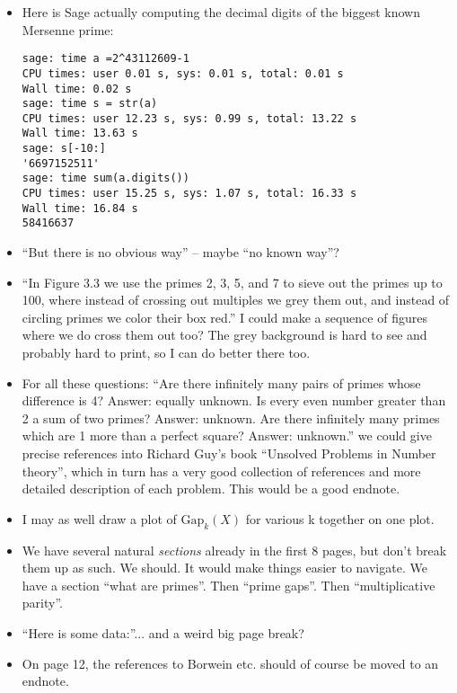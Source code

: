 \documentclass{article}
\begin{document}
\begin{itemize}
\item Here is Sage actually computing the decimal digits of the
  biggest known Mersenne prime:
\begin{verbatim}
sage: time a =2^43112609-1
CPU times: user 0.01 s, sys: 0.01 s, total: 0.01 s
Wall time: 0.02 s
sage: time s = str(a)
CPU times: user 12.23 s, sys: 0.99 s, total: 13.22 s
Wall time: 13.63 s
sage: s[-10:]
'6697152511'
sage: time sum(a.digits())
CPU times: user 15.25 s, sys: 1.07 s, total: 16.33 s
Wall time: 16.84 s
58416637
\end{verbatim}

\item ``But there is no obvious way'' -- maybe ``no known way''?

\item ``In Figure 3.3 we use the primes 2, 3, 5, and 7 to sieve out
  the primes up to 100, where instead of crossing out multiples we
  grey them out, and instead of circling primes we color their box
  red.''  I could make a sequence of figures where we do cross them
  out too?  The grey background is hard to see and probably hard to
  print, so I can do better there too.

\item For all these questions: ``Are there inﬁnitely many pairs of
  primes whose diﬀerence is 4? Answer: equally unknown. Is every even
  number greater than 2 a sum of two primes? Answer: unknown. Are
  there inﬁnitely many primes which are 1 more than a perfect square?
  Answer: unknown.''  we could give precise references into Richard
  Guy's book ``Unsolved Problems in Number theory'', which in turn has
  a very good collection of references and more detailed description
  of each problem.  This would be a good endnote. 

\item I may as well draw a plot of $\text{Gap}_k(X)$ for various k together
on one plot. 

\item We have several natural {\em sections} already in the first 8
  pages, but don't break them up as such.  We should.  It would make
  things easier to navigate.  We have a section ``what are primes''.  Then ``prime gaps''.  Then ``multiplicative parity''.

\item ``Here is some data:''... and a weird big page break?

\item On page 12, the references to Borwein etc. should of course be
  moved to an endnote.


\end{itemize}
\end{document}
